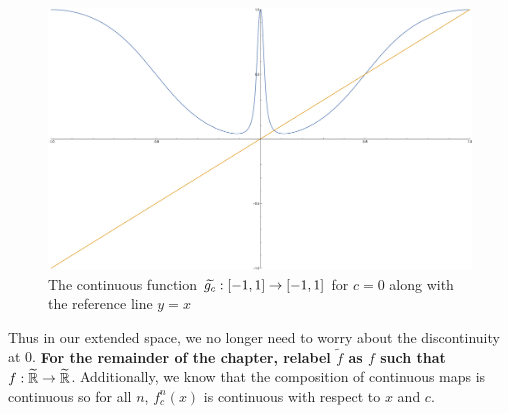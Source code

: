 \begin{myproof}
				\begin{figure}[h]
					\centering
						\includegraphics[width=.8\textwidth]{./img/compact.pdf}
						\caption{The continuous function $\widetilde{g_c}: [-1,1] \rightarrow [-1,1]$ for $c = 0$ along with the reference line $y = x$}
						\label{compact}
				\end{figure}
			\end{myproof}

			Thus in our extended space, we no longer need to worry about the discontinuity at 0. \textbf{For the remainder of the chapter, relabel $\widetilde{f}$ as $f$ such that $f: \widetilde{\mathbb{R}} \rightarrow \widetilde{\mathbb{R}}$}. Additionally, we know that the composition of continuous maps is continuous so for all $n$, $f^n_c (x)$ is continuous with respect to $x$ and $c$. 

